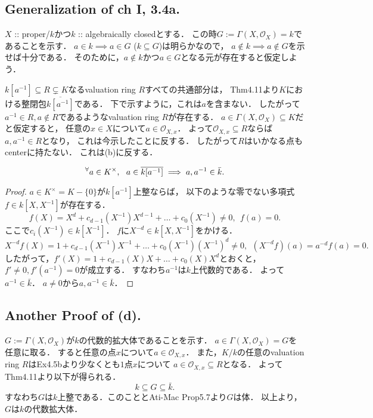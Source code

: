 \documentclass[a4paper]{jsarticle}
\newcommand{\shO}{\mathcal{O}}
\begin{document}
    \subsection{Generalization of ch I, 3.4a.}
    $X$ :: proper/$k$かつ$k$ :: algebraically closedとする．
    この時$G:=\Gamma(X, \shO_X)=k$であることを示す．
    $a \in k \implies a \in G$
    ($k \subseteq G$)は明らかなので，
    $a \not \in k \implies a \not \in G$を示せば十分である．
    そのために，$a \not \in k$かつ$a \in G$となる元が存在すると仮定しよう．

    $k[a^{-1}] \subseteq R \subsetneq K$なるvaluation ring $R$すべての共通部分は，
    Thm4.11より$K$における整閉包$\overline{k[a^{-1}]}$である．
    下で示すように，これは$a$を含まない．
    したがって$a^{-1} \in R, a \not \in R$であるようなvaluation ring $R$が存在する．
    $a \in \Gamma(X, \shO_X) \subseteq K$だと仮定すると，
    任意の$x \in X$について$a \in \shO_{X,x}$．
    よって$\shO_{X,x} \subseteq R$ならば$a,a^{-1} \in R$となり，
    これは今示したことに反する．
    したがって$R$はいかなる点もcenterに持たない．
    これは(b)に反する．

    \begin{Claim}
        \[ {}^{\forall} a \in K^{\times},~~ a \in \overline{k[a^{-1}]} \implies a,a^{-1} \in \bar{k}. \] 
    \end{Claim}
    \begin{proof}
        $a \in K^{\times}=K-\{0\}$が$k[a^{-1}]$上整ならば，
        以下のような零でない多項式$f \in k[X, X^{-1}]$が存在する．
        \[
            f(X)=X^d+c_{d-1}(X^{-1})X^{d-1}+\dots+c_0(X^{-1}) \neq 0 ,~~
            f(a)=0.
        \]
        ここで$c_i(X^{-1}) \in k[X^{-1}]$．
        $f$に$X^{-d} \in k[X,X^{-1}]$をかける．
        \[
            X^{-d}f(X)=1+c_{d-1}(X^{-1})X^{-1}+\dots+c_0(X^{-1})(X^{-1})^d \neq 0,~~
            (X^{-d}f)(a)=a^{-d}f(a)=0.
        \]
        したがって，$f'(X)=1+c_{d-1}(X)X+\dots+c_0(X)X^d$とおくと，
        $f' \neq 0, f'(a^{-1})=0$が成立する．
        すなわち$a^{-1}$は$k$上代数的である．
        よって$a^{-1} \in \bar{k}$．
        $a \neq 0$から$a,a^{-1} \in \bar{k}$．
    \end{proof}

    \subsection*{Another Proof of (d).}
    $G:=\Gamma(X,\shO_X)$が$k$の代数的拡大体であることを示す．
    $a \in \Gamma(X,\shO_X)=G$を任意に取る．
    すると任意の点$x$について$a \in \shO_{X,x}$．
    また，$K/k$の任意のvaluation ring $R$はEx4.5bより少なくとも$1$点$x$について
    $a \in \shO_{X,x} \subseteq R$となる．
    よってThm4.11より以下が得られる．
    \[ k \subseteq G \subseteq \bar{k}. \]
    すなわち$G$は$k$上整である．このこととAti-Mac Prop5.7より$G$は体．
    以上より，$G$は$k$の代数拡大体．
\end{document}
